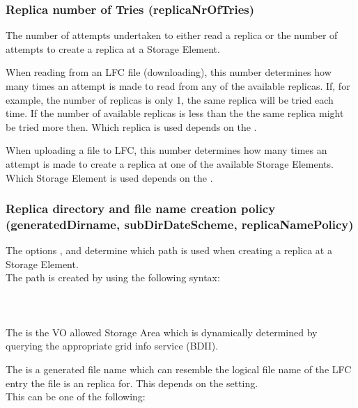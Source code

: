 \subsubsection{Replica number of Tries (replicaNrOfTries) } 

The number of attempts undertaken to either read a replica or the number of
attempts to create a replica at a Storage Element. 

\par
When reading from an LFC file (downloading), this number determines how many
times an attempt is made to read from any of the available replicas.
If, for example, the number of replicas is only 1, the same replica will be
tried each time. 
If the number of available replicas is less than the  the
same replica might be tried more then. Which replica is used depends on the
.

\par
When uploading a file to LFC, this number determines how many times an
attempt is made to create a replica at one of the available Storage
Elements. Which Storage Element is used depends on the
.

\subsubsection{Replica directory and file name creation policy
(generatedDirname, subDirDateScheme, replicaNamePolicy) }

The options ,  and 
 determine which path is used when creating a replica
at a Storage Element.\\
The path is created by using the following syntax:\\
\\
\\
\\ 
The  is the VO allowed Storage Area which is
dynamically determined by querying the appropriate grid info service (BDII). 

The  is a generated file name which can resemble
the logical file name of the LFC entry the file is an replica for. This depends
on the  setting. \\
This can be one of the following:


